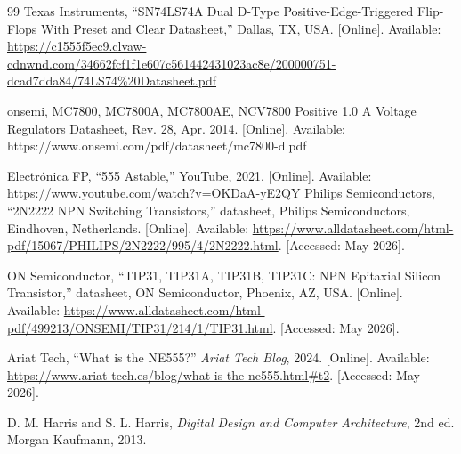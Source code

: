\documentclass[12pt,onecolumn]{IEEEtran}
\begin{document}
\begin{thebibliography}{99}
Texas Instruments, ``SN74LS74A Dual D-Type Positive-Edge-Triggered Flip-Flops With Preset and Clear Datasheet,'' Dallas, TX, USA. [Online]. Available: \url{https://c1555f5ec9.clvaw-cdnwnd.com/34662fcf1f1e607c561442431023ac8e/200000751-dcad7dda84/74LS74%20Datasheet.pdf}

onsemi, MC7800, MC7800A, MC7800AE, NCV7800 Positive 1.0 A Voltage Regulators Datasheet, Rev. 28, Apr. 2014. [Online]. Available: https://www.onsemi.com/pdf/datasheet/mc7800-d.pdf



Electrónica FP, ``555 Astable,'' YouTube, 2021. [Online]. Available: \url{https://www.youtube.com/watch?v=OKDaA-yE2QY}
Philips Semiconductors, ``2N2222 NPN Switching Transistors,'' datasheet, Philips Semiconductors, Eindhoven, Netherlands. [Online]. Available: \url{https://www.alldatasheet.com/html-pdf/15067/PHILIPS/2N2222/995/4/2N2222.html}. [Accessed: May 2026].

ON Semiconductor, ``TIP31, TIP31A, TIP31B, TIP31C: NPN Epitaxial Silicon Transistor,'' datasheet, ON Semiconductor, Phoenix, AZ, USA. [Online]. Available: \url{https://www.alldatasheet.com/html-pdf/499213/ONSEMI/TIP31/214/1/TIP31.html}. [Accessed: May 2026].

Ariat Tech, ``What is the NE555?'' \textit{Ariat Tech Blog}, 2024. [Online]. Available: \url{https://www.ariat-tech.es/blog/what-is-the-ne555.html#t2}. [Accessed: May 2026].


D. M. Harris and S. L. Harris, \textit{Digital Design and Computer
Architecture}, 2nd ed. Morgan Kaufmann, 2013.


\end{thebibliography}
\end{document}
